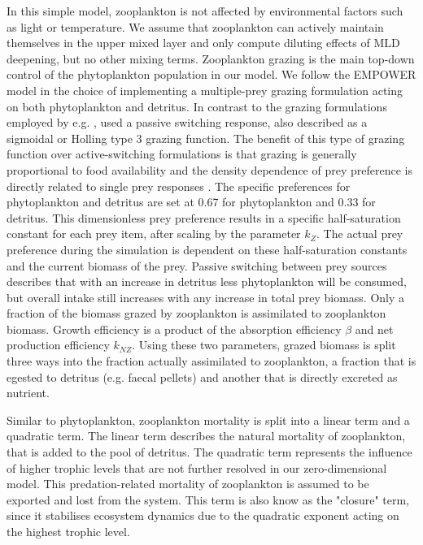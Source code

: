 \documentclass[template.tex]{subfiles}
\begin{document}
In this simple model, zooplankton is not affected by environmental factors such as light or temperature. We assume that zooplankton can actively maintain themselves in the upper mixed layer and only compute diluting effects of MLD deepening, but no other mixing terms. 
Zooplankton grazing is the main top-down control of the phytoplankton population in our model. We follow the EMPOWER model in the choice of implementing a multiple-prey grazing formulation acting on both phytoplankton and detritus. In contrast to the grazing formulations employed by e.g. \cite{Fasham1990a}, \citeauthor{Anderson2015c} used a passive switching response, also described as a sigmoidal or Holling type 3 grazing function. The benefit of this type of grazing function over active-switching formulations is that grazing is generally proportional to food availability and the density dependence of prey preference is directly related to single prey responses \citep{Gentleman2003a}.
The specific preferences for phytoplankton and detritus are set at 0.67 for phytoplankton and 0.33 for detritus. This dimensionless prey preference results in a specific half-saturation constant for each prey item, after scaling by the parameter $k_Z$. The actual prey preference during the simulation is dependent on these half-saturation constants and the current biomass of the prey. Passive switching between prey sources describes that with an increase in detritus less phytoplankton will be consumed, but overall intake still increases with any increase in total prey biomass. 
Only a fraction of the biomass grazed by zooplankton is assimilated to zooplankton biomass. Growth efficiency is a product of the absorption efficiency $\beta$ and net production efficiency $k_{NZ}$. Using these two parameters, grazed biomass is split three ways into the fraction actually assimilated to zooplankton, a fraction that is egested to detritus (e.g. faecal pellets) and another that is directly excreted as nutrient. 

Similar to phytoplankton, zooplankton mortality is split into a linear term and a quadratic term. The linear term describes the natural mortality of zooplankton, that is added to the pool of detritus. The quadratic term represents the influence of higher trophic levels that are not further resolved in our zero-dimensional model. This predation-related mortality of zooplankton is assumed to be exported and lost from the system.
This term is also know as the "closure" term, since it stabilises ecosystem dynamics due to the quadratic exponent acting on the highest trophic level.\\
\end{document}
